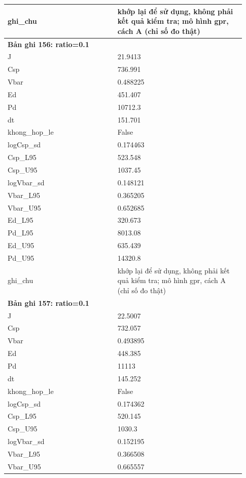 \begin{longtable}{p{0.43\linewidth}p{0.50\linewidth}}
ghi\_\allowbreak chu & khớp lại để sử dụng, không phải kết quả kiểm tra; mô hình gpr, cách A (chỉ số đo thật) \\
\midrule
\multicolumn{2}{p{0.95\linewidth}}{\textbf{Bản ghi 156: ratio=0.1}} \\
J & 21.9413 \\
Csp & 736.991 \\
Vbar & 0.488225 \\
Ed & 451.407 \\
Pd & 10712.3 \\
dt & 151.701 \\
khong\_\allowbreak hop\_\allowbreak le & False \\
logCsp\_\allowbreak sd & 0.174463 \\
Csp\_\allowbreak L95 & 523.548 \\
Csp\_\allowbreak U95 & 1037.45 \\
logVbar\_\allowbreak sd & 0.148121 \\
Vbar\_\allowbreak L95 & 0.365205 \\
Vbar\_\allowbreak U95 & 0.652685 \\
Ed\_\allowbreak L95 & 320.673 \\
Pd\_\allowbreak L95 & 8013.08 \\
Ed\_\allowbreak U95 & 635.439 \\
Pd\_\allowbreak U95 & 14320.8 \\
ghi\_\allowbreak chu & khớp lại để sử dụng, không phải kết quả kiểm tra; mô hình gpr, cách A (chỉ số đo thật) \\
\midrule
\multicolumn{2}{p{0.95\linewidth}}{\textbf{Bản ghi 157: ratio=0.1}} \\
J & 22.5007 \\
Csp & 732.057 \\
Vbar & 0.493895 \\
Ed & 448.385 \\
Pd & 11113 \\
dt & 145.252 \\
khong\_\allowbreak hop\_\allowbreak le & False \\
logCsp\_\allowbreak sd & 0.174362 \\
Csp\_\allowbreak L95 & 520.145 \\
Csp\_\allowbreak U95 & 1030.3 \\
logVbar\_\allowbreak sd & 0.152195 \\
Vbar\_\allowbreak L95 & 0.366508 \\
Vbar\_\allowbreak U95 & 0.665557 \\

\end{longtable}
